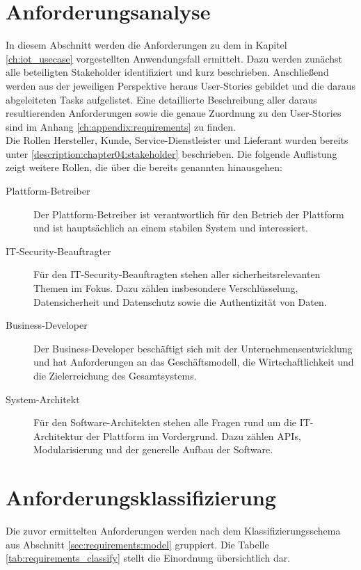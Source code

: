 %
%
\section{Anforderungsanalyse}
\label{sec:requirements:analysis}
In diesem Abschnitt werden die Anforderungen zu dem in Kapitel \ref{ch:iot_usecase} vorgestellten Anwendungsfall ermittelt. Dazu werden zunächst alle beteiligten Stakeholder identifiziert und kurz beschrieben. Anschließend werden aus der jeweiligen Perspektive heraus User-Stories gebildet und die daraus abgeleiteten Tasks aufgelistet. Eine detaillierte Beschreibung aller daraus resultierenden Anforderungen sowie die genaue Zuordnung zu den User-Stories sind im Anhang \ref{ch:appendix:requirements} zu finden.\\

Die Rollen Hersteller, Kunde, Service-Dienstleister und Lieferant wurden bereits unter \ref{description:chapter04:stakeholder} beschrieben. Die folgende Auflistung zeigt weitere Rollen, die über die bereits genannten hinausgehen:
\begin{description}
  \item[Plattform-Betreiber] Der Plattform-Betreiber ist verantwortlich für den Betrieb der Plattform und ist hauptsächlich an einem stabilen System und interessiert.
  \item[IT-Security-Beauftragter] Für den IT-Security-Beauftragten stehen aller sicherheitsrelevanten Themen im Fokus. Dazu zählen insbesondere Verschlüsselung, Datensicherheit und Datenschutz sowie die Authentizität von Daten.
  \item[Business-Developer] Der Business-Developer beschäftigt sich mit der Unternehmensentwicklung und hat Anforderungen an das Geschäftsmodell, die Wirtschaftlichkeit und die Zielerreichung des Gesamtsystems.
  \item[System-Architekt] Für den Software-Architekten stehen alle Fragen rund um die IT-Architektur der Plattform im Vordergrund. Dazu zählen \ac{API}s, Modularisierung und der generelle Aufbau der Software.
\end{description}



%
%
\section{Anforderungsklassifizierung}
\label{sec:requirements:classification}
Die zuvor ermittelten Anforderungen werden nach dem Klassifizierungsschema aus Abschnitt \ref{sec:requirements:model} gruppiert. Die Tabelle \ref{tab:requirements_classify} stellt die Einordnung übersichtlich dar.

